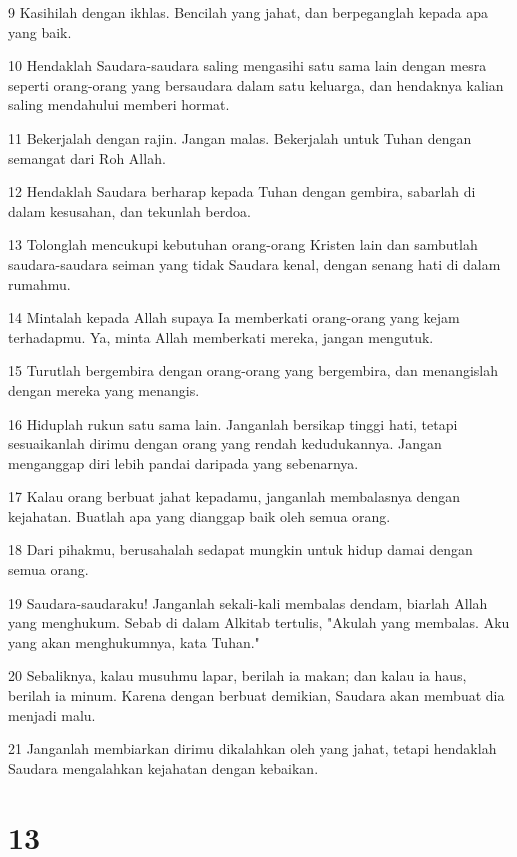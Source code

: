 \par 9 Kasihilah dengan ikhlas. Bencilah yang jahat, dan berpeganglah kepada apa yang baik.
\par 10 Hendaklah Saudara-saudara saling mengasihi satu sama lain dengan mesra seperti orang-orang yang bersaudara dalam satu keluarga, dan hendaknya kalian saling mendahului memberi hormat.
\par 11 Bekerjalah dengan rajin. Jangan malas. Bekerjalah untuk Tuhan dengan semangat dari Roh Allah.
\par 12 Hendaklah Saudara berharap kepada Tuhan dengan gembira, sabarlah di dalam kesusahan, dan tekunlah berdoa.
\par 13 Tolonglah mencukupi kebutuhan orang-orang Kristen lain dan sambutlah saudara-saudara seiman yang tidak Saudara kenal, dengan senang hati di dalam rumahmu.
\par 14 Mintalah kepada Allah supaya Ia memberkati orang-orang yang kejam terhadapmu. Ya, minta Allah memberkati mereka, jangan mengutuk.
\par 15 Turutlah bergembira dengan orang-orang yang bergembira, dan menangislah dengan mereka yang menangis.
\par 16 Hiduplah rukun satu sama lain. Janganlah bersikap tinggi hati, tetapi sesuaikanlah dirimu dengan orang yang rendah kedudukannya. Jangan menganggap diri lebih pandai daripada yang sebenarnya.
\par 17 Kalau orang berbuat jahat kepadamu, janganlah membalasnya dengan kejahatan. Buatlah apa yang dianggap baik oleh semua orang.
\par 18 Dari pihakmu, berusahalah sedapat mungkin untuk hidup damai dengan semua orang.
\par 19 Saudara-saudaraku! Janganlah sekali-kali membalas dendam, biarlah Allah yang menghukum. Sebab di dalam Alkitab tertulis, "Akulah yang membalas. Aku yang akan menghukumnya, kata Tuhan."
\par 20 Sebaliknya, kalau musuhmu lapar, berilah ia makan; dan kalau ia haus, berilah ia minum. Karena dengan berbuat demikian, Saudara akan membuat dia menjadi malu.
\par 21 Janganlah membiarkan dirimu dikalahkan oleh yang jahat, tetapi hendaklah Saudara mengalahkan kejahatan dengan kebaikan.

\chapter{13}

